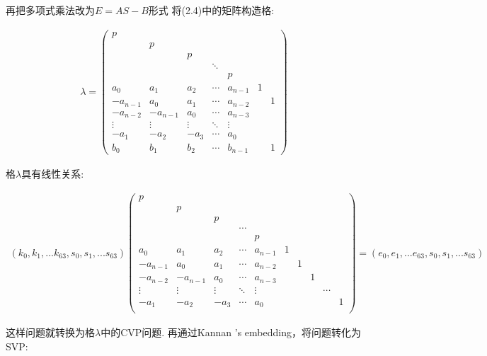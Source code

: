 \documentclass[12pt,a4paper]{article}
\newcommand{\supercite}[2][]{\textsuperscript{\citep[#1]{#2}}}
\numberwithin{equation}{section}
\begin{document}
再把多项式乘法改为$E=AS-B$形式
将(2.4)中的矩阵构造格:

\begin{align}
	\lambda=
	\left(
	\begin{smallmatrix}
		p        &          &        &        &         &   &   \\
		& p        &        &        &         &   &   \\
		&          & p      &        &         &   &   \\
		&          &        & \ddots &         &   &   \\
		&          &        &        & p       &   &   \\
		a_0      & a_1      & a_2    & \cdots & a_{n-1} & 1 &   \\
		-a_{n-1} & a_0      & a_1    & \cdots & a_{n-2} &   & 1 \\
		-a_{n-2} & -a_{n-1} & a_0    & \cdots & a_{n-3} &   &   \\
		\vdots   & \vdots   & \vdots & \ddots & \vdots  &   &   \\
		-a_1     & -a_2     & -a_3   & \cdots & a_0     &   &   \\
		b_0      & b_1      & b_2    & \cdots & b_{n-1} &   & 1
	\end{smallmatrix}
	\right)
\end{align}

格$\lambda$具有线性关系:

\begin{align}
	(k_0,k_1,...k_{63},s_0,s_1,...s_{63})
	\left(
	\begin{smallmatrix}
			p\\
			&p\\
			&&p\\
			&&&\cdots\\
			&&&&p\\
			a_0    &a_1    &a_2   &\cdots &a_{n-1}            &1\\
			-a_{n-1}&a_0    &a_1   &\cdots &a_{n-2}       &&1\\
			-a_{n-2}&-a_{n-1}&a_0   &\cdots &a_{n-3}  &&&1\\
			\vdots &\vdots &\vdots&\ddots &\vdots             &&&&\cdots\\
			-a_1    &-a_2    &-a_3   &\cdots &a_0 &&&&&1\\
		\end{smallmatrix}
	\right)
	=
	(e_0,e_1,...e_{63},s_0,s_1,...s_{63})
\end{align}

这样问题就转换为格$\lambda$中的CVP问题.
再通过Kannan 's embedding\supercite[]{kannan1987}，将问题转化为SVP:
\end{document}
